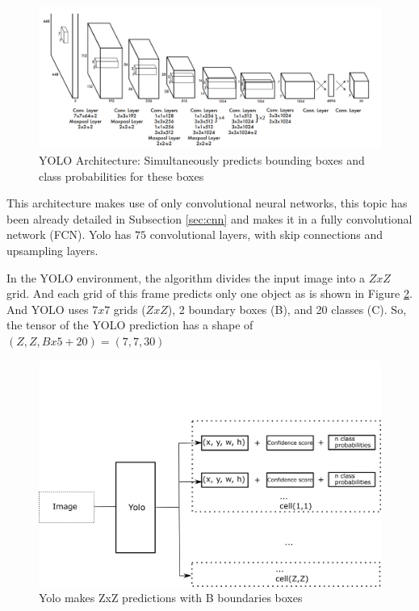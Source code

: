 \begin{figure}[H]
\centering
\includegraphics[width=\textwidth]{imagens/yolo.png}
\caption{YOLO Architecture: Simultaneously predicts bounding boxes and class probabilities for these boxes \cite{redmon2016you}}
\label{fig:yolo_arc}
\end{figure}

This architecture makes use of only convolutional neural networks, this topic has been already detailed in Subsection \ref{sec:cnn} and makes it in a fully convolutional network (FCN). Yolo has $75$ convolutional layers, with skip connections and upsampling layers.  





In the YOLO environment, the algorithm divides the input image into a $ZxZ$ grid. And each grid of this frame predicts only one object as is shown in Figure \ref{fig:yolo_flow}. And YOLO uses $7x7$ grids ($ZxZ$), 2 boundary boxes (B), and 20 classes (C). So, the tensor of the YOLO prediction has a shape of $(Z, Z, Bx5+20) = (7,7,30)$


\begin{figure}[H]
\centering
\includegraphics[width=\textwidth]{imagens/yolo_flow.png}
\caption{Yolo makes ZxZ predictions with B boundaries boxes}
\label{fig:yolo_flow}
\end{figure}

